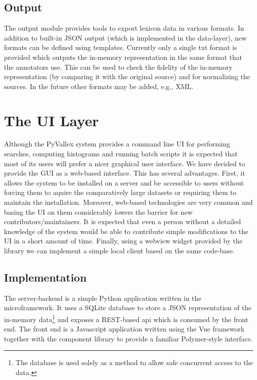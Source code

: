 \documentclass[10pt, a4paper]{article}
\begin{document}
\subsection{Output}

The output module provides tools to export lexicon data in various formats. In addition to built-in JSON
output (which is implemented in the data-layer), new formats can be defined using \cite{tool:Jinja2} templates.
Currently only a single txt format is provided which outputs the in-memory representation in the same
format that the annotators use. This can be used to check the fidelity of the in-memory representation
(by comparing it with the original source) and for normalizing the sources. In the future other formats
may be added, e.g., XML.


\section{The UI Layer}

Although the PyVallex system provides a command line UI for performing searches, computing histograms
and running batch scripts it is expected that most of its users will prefer a nicer graphical user interface.
We have decided to provide the GUI as a web-based interface. This has several advantages. First, it allows
the system to be installed on a server and be accessible to users without forcing them to aquire the comparatively large datasets or requiring them to maintain the installation. Moreover, web-based technologies are very
common and basing the UI on them considerably lowers the barrier for new contributors/maintainers. It
is expected that even a person without a detailed knowledge of the system would be able to contribute simple modifications to the UI in a short amount of time. Finally, using a webview widget provided by the \cite{tool:Qt}
library we can implement a simple local client based on the same code-base.

\subsection{Implementation}
The server-backend is a simple Python \cite{tool:WSGI} application written in the \cite{tool:bottle.py}
microframework. It uses a SQLite database \cite{tool:SQLite} to store a JSON representation of the in-memory
data\footnote{The database is used solely as a method to allow safe concurrent access to the data.} and exposes a REST-based api which is consumed by the front end. The front end is a Javascript application written using the
\cite{tool:Vue.js} Vue framework together with the \cite{tool:Vuetify} component library to provide a familiar
\cite{tool:polymer} Polymer-style interface.
\end{document}
